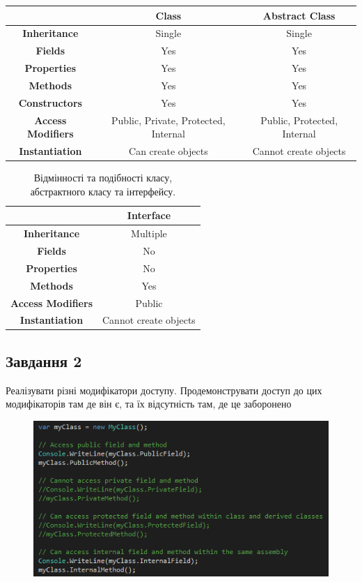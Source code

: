 \documentclass[oneside,14pt]{extarticle}
\begin{document}
\begin{normalsize}
	\begin{table}[H]
		\centering
		\begin{tabular}{ |c|c|c| }
			\hline
			& \textbf{Class} & \textbf{Abstract Class} \\ 
			\hline
			\textbf{Inheritance} & Single & Single \\ 
			\hline
			\textbf{Fields} & Yes & Yes \\ 
			\hline
			\textbf{Properties} & Yes & Yes \\ 
			\hline
			\textbf{Methods} & Yes & Yes \\ 
			\hline
			\textbf{Constructors} & Yes & Yes \\ 
			\hline
			\textbf{Access Modifiers} & Public, Private, Protected, Internal & Public, Protected, Internal \\ 
			\hline
			\textbf{Instantiation} & Can create objects & Cannot create objects \\ 
			\hline
		\end{tabular}
	\end{table}
	
	\begin{table}[H]
		\centering
		\begin{tabular}{ |c|c| }
			\hline
			& \textbf{Interface} \\ 
			\hline
			\textbf{Inheritance} & Multiple \\ 
			\hline
			\textbf{Fields} & No \\ 
			\hline
			\textbf{Properties} & No \\ 
			\hline
			\textbf{Methods} & Yes \\ 
			\hline
			\textbf{Access Modifiers} & Public \\ 
			\hline
			\textbf{Instantiation} & Cannot create objects \\ 
			\hline
		\end{tabular}
		\caption{Відмінності та подібності класу, абстрактного класу та інтерфейсу.}
	\end{table}
	
	\subsection*{Завдання 2}
	Реалізувати різні модифікатори доступу. Продемонструвати доступ до цих
	модифікаторів там де він є, та їх відсутність там, де це заборонено
	\begin{figure}[H]
		\centering
		\includegraphics[scale=0.7]{12}
	\end{figure}


\end{normalsize}
\end{document}
